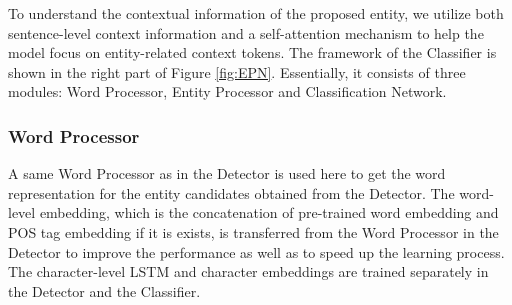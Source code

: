\documentclass[11pt,a4paper]{article}
\begin{document}
To understand the contextual information of the proposed entity, we utilize both sentence-level context information and a self-attention mechanism to help the model focus on entity-related context tokens. 
The framework of the Classifier is shown in the right part of Figure \ref{fig:EPN}. Essentially, it consists of three modules: Word Processor, Entity Processor and Classification Network.

\begin{table*}[!ht]
\centering
{}
\caption{Corpora Statistics for the ACE-2004, ACE-2005 and CoNLL-2003 datasets.}
\label{data_statistics}
\end{table*}

\subsubsection{Word Processor}
A same Word Processor as in the Detector is used here to get the word representation for the entity candidates obtained from the Detector.
The word-level embedding, which is the concatenation of pre-trained word embedding and POS tag embedding if it is exists, is transferred from the Word Processor in the Detector to improve the performance as
well as to speed up the learning process. The character-level LSTM and character embeddings are trained separately in the Detector and the Classifier.
\end{document}

